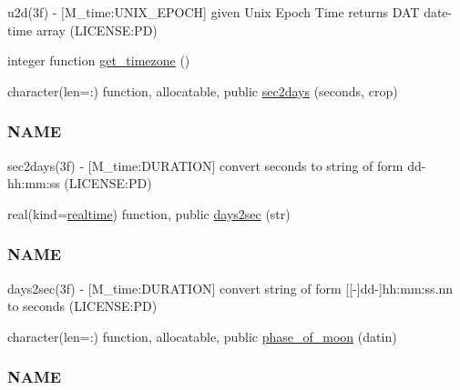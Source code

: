 \begin{DoxyCompactItemize}
\begin{DoxyCompactList}
u2d(3f) -\/ \mbox{[}M\+\_\+time\+:U\+N\+I\+X\+\_\+\+E\+P\+O\+CH\mbox{]} given Unix Epoch Time returns D\+AT date-\/time array (L\+I\+C\+E\+N\+SE\+:PD) \end{DoxyCompactList}\item 
integer function \mbox{\hyperlink{namespacem__time_a7903410a1d28bcdf3d33ab0c2d74b124}{get\+\_\+timezone}} ()
\item 
character(len=\+:) function, allocatable, public \mbox{\hyperlink{namespacem__time_a7788285d79b8d58323b05e9a30a2d992}{sec2days}} (seconds, crop)
\begin{DoxyCompactList}\small\item\em \subsubsection*{N\+A\+ME}

sec2days(3f) -\/ \mbox{[}M\+\_\+time\+:D\+U\+R\+A\+T\+I\+ON\mbox{]} convert seconds to string of form dd-\/hh\+:mm\+:ss (L\+I\+C\+E\+N\+SE\+:PD) \end{DoxyCompactList}\item 
real(kind=\mbox{\hyperlink{namespacem__time_ac10ea9e8d59ec74eaa7d89f2517d7422}{realtime}}) function, public \mbox{\hyperlink{namespacem__time_a99393c7906f1989f90ece03969224938}{days2sec}} (str)
\begin{DoxyCompactList}\small\item\em \subsubsection*{N\+A\+ME}

days2sec(3f) -\/ \mbox{[}M\+\_\+time\+:D\+U\+R\+A\+T\+I\+ON\mbox{]} convert string of form \mbox{[}\mbox{[}-\/\mbox{]}dd-\/\mbox{]}hh\+:mm\+:ss.\+nn to seconds (L\+I\+C\+E\+N\+SE\+:PD) \end{DoxyCompactList}\item 
character(len=\+:) function, allocatable, public \mbox{\hyperlink{namespacem__time_ab8a976e2f113cc38b6df80974cee55dc}{phase\+\_\+of\+\_\+moon}} (datin)
\begin{DoxyCompactList}\small\item\em \subsubsection*{N\+A\+ME}


\end{DoxyCompactList}
\end{DoxyCompactItemize}
